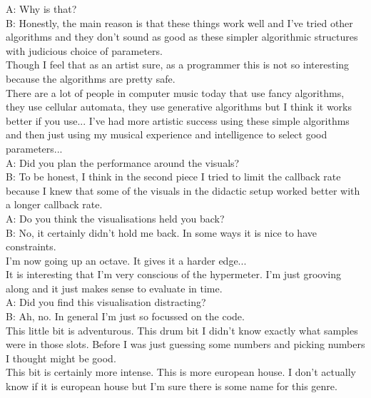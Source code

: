 A: Why is that?\\

B: Honestly, the main reason is that these things work well and I've tried other algorithms and they don't sound as good as these simpler algorithmic structures with judicious choice of parameters.\\

Though I feel that as an artist sure, as a programmer this is not so interesting because the algorithms are pretty safe.\\

There are a lot of people in computer music today that use fancy algorithms, they use cellular automata, they use generative algorithms but I think it works better if you use... I've had more artistic success using these simple algorithms and then just using my musical experience and intelligence to select good parameters...\\

A: Did you plan the performance around the visuals?\\

B: To be honest, I think in the second piece I tried to limit the callback rate because I knew that some of the visuals in the didactic setup worked better with a longer callback rate.\\

A: Do you think the visualisations held you back?\\

B: No, it certainly didn't hold me back. In some ways it is nice to have constraints.\\

I'm now going up an octave. It gives it a harder edge...\\

It is interesting that I'm very conscious of the hypermeter. I'm just grooving along and it just makes sense to evaluate in time.\\

A: Did you find this visualisation distracting?\\

B: Ah, no. In general I'm just so focussed on the code.\\

This little bit is adventurous. This drum bit I didn't know exactly what samples were in those slots. Before I was just guessing some numbers and picking numbers I thought might be good.\\

This bit is certainly more intense. This is more european house. I don't actually know if it is european house but I'm sure there is some name for this genre.\\

